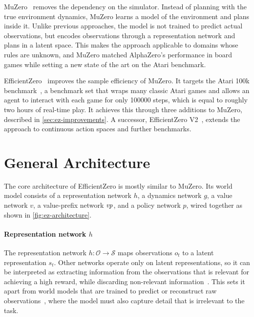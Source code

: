 MuZero~\cite{schrittwieser_mastering_2020} removes the dependency on the simulator.
Instead of planning with the true environment dynamics, MuZero learns a model
of the environment and plans inside it.
Unlike previous approaches, the model is not trained to predict actual observations,
but encodes observations through a representation network and plans in a latent space.
This makes the approach applicable to domains whose rules are unknown, and
MuZero matched AlphaZero's performance in board games while
setting a new state of the art on the Atari benchmark.

EfficientZero~\cite{ye_mastering_2021} improves the sample efficiency of MuZero.
It targets the Atari 100k benchmark~\cite{kaiser_model-based_2024}, a benchmark
set that wraps many classic Atari games and allows an agent to interact with each
game for only \num{100000} steps, which is equal to roughly two hours of real-time play.
It achieves this through three additions to MuZero, described in
\cref{sec:ez-improvements}.
A successor, EfficientZero V2~\cite{wang_efficientzero_2024}, extends the
approach to continuous action spaces and further benchmarks.

\section{General Architecture}\label{sec:ez-architecture}

The core architecture of EfficientZero is mostly similar to MuZero.
Its world model consists of a representation network $h$, a dynamics network $g$,
a value network $v$, a value-prefix network $\mathit{vp}$, and a policy network $p$,
wired together as shown in \cref{fig:ez-architecture}.



\paragraph{Representation network $h$}
The representation network $h:\mathcal{O}\to\mathcal{S}$ maps observations $o_t$
to a latent representation $s_t$.
Other networks operate only on latent representations, so it can be interpreted
as extracting information from the observations that is relevant for achieving
a high reward, while discarding non-relevant information~\cite{grimm_value_2020}.
This sets it apart from world models that are trained to predict or reconstruct
raw observations~\cite{ha_world_2018,kaiser_model-based_2024,hafner_learning_2019,hafner_mastering_2024},
where the model must also capture detail that is irrelevant to the task.

